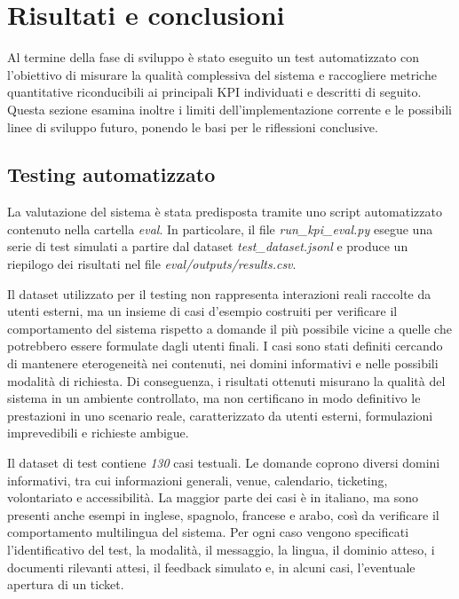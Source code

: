\chapter{Risultati e conclusioni}

Al termine della fase di sviluppo è stato eseguito un test automatizzato con l’obiettivo di misurare la qualità complessiva del sistema e raccogliere metriche quantitative riconducibili ai principali KPI individuati e descritti di seguito. Questa sezione esamina inoltre i limiti dell'implementazione corrente e le possibili linee di sviluppo futuro, ponendo le basi per le riflessioni conclusive.

\section{Testing automatizzato}

La valutazione del sistema è stata predisposta tramite uno script automatizzato contenuto nella cartella \textit{eval}. In particolare, il file \textit{run\_kpi\_eval.py} esegue una serie di test simulati a partire dal dataset \textit{test\_dataset.jsonl} e produce un riepilogo dei risultati nel file \textit{eval/outputs/results.csv}.

Il dataset utilizzato per il testing non rappresenta interazioni reali raccolte da utenti esterni, ma un insieme di casi d’esempio costruiti per verificare il comportamento del sistema rispetto a domande il più possibile vicine a quelle che potrebbero essere formulate dagli utenti finali. I casi sono stati definiti cercando di mantenere eterogeneità nei contenuti, nei domini informativi e nelle possibili modalità di richiesta. Di conseguenza, i risultati ottenuti misurano la qualità del sistema in un ambiente controllato, ma non certificano in modo definitivo le prestazioni in uno scenario reale, caratterizzato da utenti esterni, formulazioni imprevedibili e richieste ambigue.

Il dataset di test contiene \textit{130} casi testuali. Le domande coprono diversi domini informativi, tra cui informazioni generali, venue, calendario, ticketing, volontariato e accessibilità. La maggior parte dei casi è in italiano, ma sono presenti anche esempi in inglese, spagnolo, francese e arabo, così da verificare il comportamento multilingua del sistema. Per ogni caso vengono specificati l’identificativo del test, la modalità, il messaggio, la lingua, il dominio atteso, i documenti rilevanti attesi, il feedback simulato e, in alcuni casi, l’eventuale apertura di un ticket.

